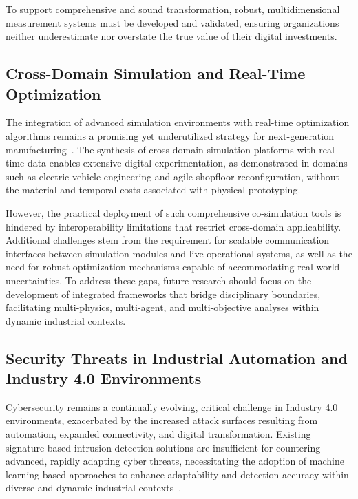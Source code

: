 \documentclass[sigconf]{acmart}
\begin{document}
To support comprehensive and sound transformation, robust, multidimensional measurement systems must be developed and validated, ensuring organizations neither underestimate nor overstate the true value of their digital investments.

\subsection{Cross-Domain Simulation and Real-Time Optimization}

The integration of advanced simulation environments with real-time optimization algorithms remains a promising yet underutilized strategy for next-generation manufacturing~\cite{ref95}. The synthesis of cross-domain simulation platforms with real-time data enables extensive digital experimentation, as demonstrated in domains such as electric vehicle engineering and agile shopfloor reconfiguration, without the material and temporal costs associated with physical prototyping.

However, the practical deployment of such comprehensive co-simulation tools is hindered by interoperability limitations that restrict cross-domain applicability. Additional challenges stem from the requirement for scalable communication interfaces between simulation modules and live operational systems, as well as the need for robust optimization mechanisms capable of accommodating real-world uncertainties. To address these gaps, future research should focus on the development of integrated frameworks that bridge disciplinary boundaries, facilitating multi-physics, multi-agent, and multi-objective analyses within dynamic industrial contexts.

\subsection{Security Threats in Industrial Automation and Industry 4.0 Environments}

Cybersecurity remains a continually evolving, critical challenge in Industry 4.0 environments, exacerbated by the increased attack surfaces resulting from automation, expanded connectivity, and digital transformation. Existing signature-based intrusion detection solutions are insufficient for countering advanced, rapidly adapting cyber threats, necessitating the adoption of machine learning-based approaches to enhance adaptability and detection accuracy within diverse and dynamic industrial contexts~\cite{ref32,ref35}.
\end{document}
